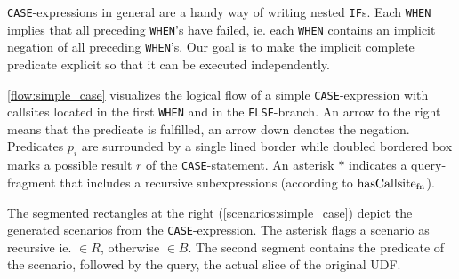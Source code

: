 \texttt{CASE}-expressions in general are a handy way of writing nested \texttt{IF}s. Each \texttt{WHEN} implies that all preceding \texttt{WHEN}'s have failed, ie. each \texttt{WHEN} contains an implicit negation of all preceding \texttt{WHEN}'s. Our goal is to make the implicit complete predicate explicit so that it can be executed independently.

\autoref{flow:simple_case} visualizes the logical flow of a simple \texttt{CASE}-expression with callsites located in the first \texttt{WHEN} and in the \texttt{ELSE}-branch. An arrow to the right means that the predicate is fulfilled, an arrow down denotes the negation. Predicates $p_i$ are surrounded by a single lined border while doubled bordered box marks a possible result $r$ of the \texttt{CASE}-statement. An asterisk $\ast$ indicates a query-fragment that includes a recursive subexpressions (according to $\operatorname{\text{hasCallsite}_{fn}}$).

The segmented rectangles at the right (\autoref{scenarios:simple_case}) depict the generated scenarios from the \texttt{CASE}-expression. The asterisk flags a scenario as recursive ie. $\in R$, otherwise $\in B$. The second segment contains the predicate of the scenario, followed by the query, the actual slice of the original UDF.

